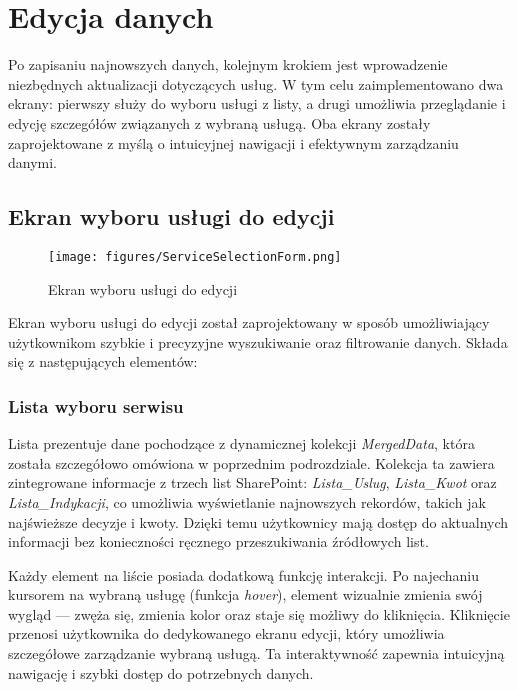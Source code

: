 \section{Edycja danych}

Po zapisaniu najnowszych danych, kolejnym krokiem jest wprowadzenie niezbędnych aktualizacji dotyczących usług. W tym celu zaimplementowano dwa ekrany: pierwszy służy do wyboru usługi z listy, a drugi umożliwia przeglądanie i edycję szczegółów związanych z wybraną usługą. Oba ekrany zostały zaprojektowane z myślą o intuicyjnej nawigacji i efektywnym zarządzaniu danymi.

\subsection{Ekran wyboru usługi do edycji}

\begin{figure}[h]
\centering
\texttt{[image: figures/ServiceSelectionForm.png]}
\caption{Ekran wyboru usługi do edycji}
\label{fig:ServiceSelectionForm }
\end{figure}

Ekran wyboru usługi do edycji został zaprojektowany w sposób umożliwiający użytkownikom szybkie i precyzyjne wyszukiwanie oraz filtrowanie danych. Składa się z następujących elementów:

\subsubsection*{Lista wyboru serwisu}

Lista prezentuje dane pochodzące z dynamicznej kolekcji \textit{MergedData}, która została szczegółowo omówiona w poprzednim podrozdziale. Kolekcja ta zawiera zintegrowane informacje z trzech list SharePoint: \textit{Lista\_Uslug}, \textit{Lista\_Kwot} oraz \textit{Lista\_Indykacji}, co umożliwia wyświetlanie najnowszych rekordów, takich jak najświeższe decyzje i kwoty. Dzięki temu użytkownicy mają dostęp do aktualnych informacji bez konieczności ręcznego przeszukiwania źródłowych list.

Każdy element na liście posiada dodatkową funkcję interakcji. Po najechaniu kursorem na wybraną usługę (funkcja \textit{hover}), element wizualnie zmienia swój wygląd — zwęża się, zmienia kolor oraz staje się możliwy do kliknięcia. Kliknięcie przenosi użytkownika do dedykowanego ekranu edycji, który umożliwia szczegółowe zarządzanie wybraną usługą. Ta interaktywność zapewnia intuicyjną nawigację i szybki dostęp do potrzebnych danych.


